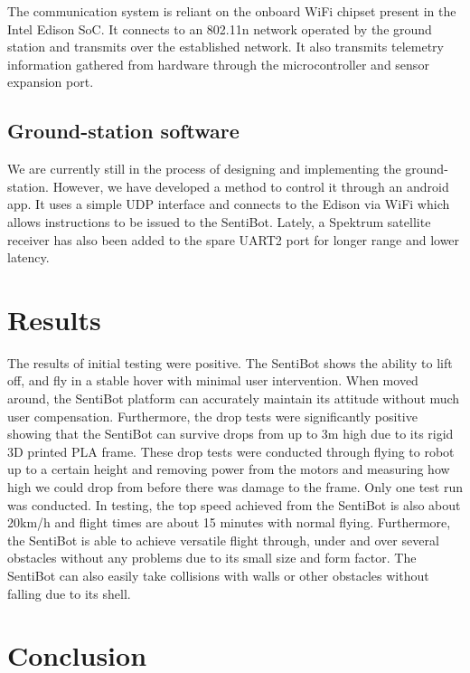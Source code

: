 \documentclass[12pt]{article}
\begin{document}
The communication system is reliant on the onboard WiFi chipset present in the Intel Edison SoC. It connects to an 802.11n network operated by the ground station and transmits over the established network. It also transmits telemetry information gathered from hardware through the microcontroller and sensor expansion port.

\subsection{Ground-station software}

We are currently still in the process of designing and implementing the ground-station. However, we have developed a method to control it through an android app. It uses a simple UDP interface and connects to the Edison via WiFi which allows instructions to be issued to the SentiBot. Lately, a Spektrum satellite receiver has also been added to the spare UART2 port for longer range and lower latency. 

\section{Results}

The results of initial testing were positive. The SentiBot shows the ability to lift off, and fly in a stable hover with minimal user intervention. When moved around, the SentiBot platform can accurately maintain its attitude without much user compensation. Furthermore, the drop tests were significantly positive showing that the SentiBot can survive drops from up to 3m high due to its rigid 3D printed PLA frame. These drop tests were conducted through flying to robot up to a certain height and removing power from the motors and measuring how high we could drop from before there was damage to the frame. Only one test run was conducted. In testing, the top speed achieved from the SentiBot is also about 20km/h and flight times are about 15 minutes with normal flying. Furthermore, the SentiBot is able to achieve versatile flight through, under and over several obstacles without any problems due to its small size and form factor. The SentiBot can also easily take collisions with walls or other obstacles without falling due to its shell. 

\section{Conclusion}
\end{document}
